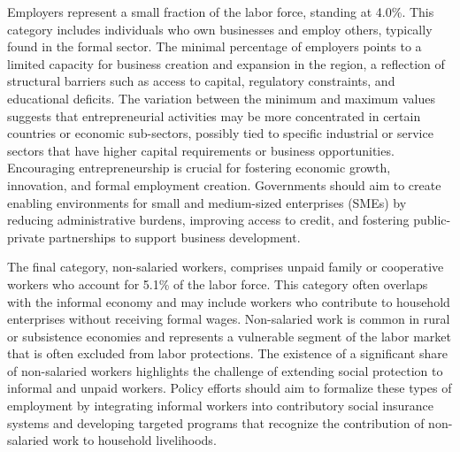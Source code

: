 \documentclass[english]{article}
\begin{document}
\begin{enumerate}
Employers represent a small fraction of the labor force, standing at 4.0\%. This category includes individuals who own businesses and employ others, typically found in the formal sector. The minimal percentage of employers points to a limited capacity for business creation and expansion in the region, a reflection of structural barriers such as access to capital, regulatory constraints, and educational deficits.
The variation between the minimum and maximum values suggests that entrepreneurial activities may be more concentrated in certain countries or economic sub-sectors, possibly tied to specific industrial or service sectors that have higher capital requirements or business opportunities. Encouraging entrepreneurship is crucial for fostering economic growth, innovation, and formal employment creation. Governments should aim to create enabling environments for small and medium-sized enterprises (SMEs) by reducing administrative burdens, improving access to credit, and fostering public-private partnerships to support business development.

The final category, non-salaried workers, comprises unpaid family or cooperative workers who account for 5.1\% of the labor force. This category often overlaps with the informal economy and may include workers who contribute to household enterprises without receiving formal wages. Non-salaried work is common in rural or subsistence economies and represents a vulnerable segment of the labor market that is often excluded from labor protections. The existence of a significant share of non-salaried workers highlights the challenge of extending social protection to informal and unpaid workers. Policy efforts should aim to formalize these types of employment by integrating informal workers into contributory social insurance systems and developing targeted programs that recognize the contribution of non-salaried work to household livelihoods.


\end{enumerate}
\end{document}
